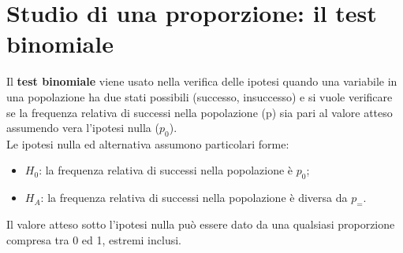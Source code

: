 \documentclass[drafts, 10pt]{book}
\begin{document}
\section{Studio di una proporzione: il test binomiale}

Il \textbf{test binomiale} viene usato nella verifica delle ipotesi quando una variabile in una popolazione ha due stati possibili (successo, insuccesso) e si vuole verificare se la frequenza relativa di successi nella popolazione (p) sia pari al valore atteso assumendo vera l'ipotesi nulla ($p_0$).
\\
Le ipotesi nulla ed alternativa assumono particolari forme:
\begin{itemize}
\item $H_0$: la frequenza relativa di successi nella popolazione è $p_0$;
\item $H_A$: la frequenza relativa di successi nella popolazione è diversa da $p_=$.
\end{itemize}
Il valore atteso sotto l'ipotesi nulla può essere dato da una qualsiasi proporzione compresa tra 0 ed 1, estremi inclusi.
\end{document}
